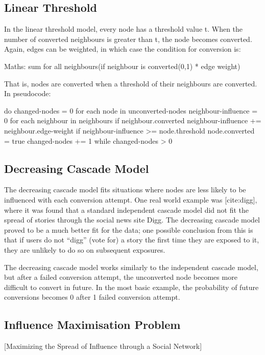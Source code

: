 \subsection{Linear Threshold}
 In the linear threshold model, every node has a threshold value t. When the number of converted neighbours is greater than t, the node becomes converted. Again, edges can be weighted, in which case the condition for conversion is:

Maths: sum for all neighbours(if neighbour is converted(0,1) * edge weight)

That is, nodes are converted when a threshold of their neighbours are converted. In pseudocode:

do {
  changed-nodes = 0
  for each node in unconverted-nodes {
    neighbour-influence = 0
    for each neighbour in neighbours {
      if neighbour.converted {
        neighbour-influence += neighbour.edge-weight
      }
    }
    if neighbour-influence >= node.threshold {
      node.converted = true
      changed-nodes += 1
    } 
  }
} while changed-nodes > 0

\subsection{Decreasing Cascade Model}

The decreasing cascade model fits situations where nodes are less likely to be influenced with each conversion attempt. One real world example was [cite:digg], where it was found that a standard independent cascade model did not fit the spread of stories through the social news site Digg. The decreasing cascade model proved to be a much better fit for the data; one possible conclusion from this is that if users do not ``digg'' (vote for) a story the first time they are exposed to it, they are unlikely to do so on subsequent exposures.

The decreasing cascade model works similarly to the independent cascade model, but after a failed conversion attempt, the unconverted node becomes more difficult to convert in future. In the most basic example, the probability of future conversions becomes 0 after 1 failed conversion attempt.

\subsection{Influence Maximisation Problem}

[Maximizing the Spread of Influence through a Social Network]

